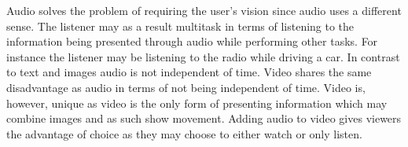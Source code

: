 Audio solves the problem of requiring the user's vision since audio uses a different sense. The listener may as a result multitask in terms of listening to the information being presented through audio while performing other tasks. For instance the listener may be listening to the radio while driving a car. In contrast to text and images audio is not independent of time. Video shares the same disadvantage as audio in terms of not being independent of time. Video is, however, unique as video is the only form of presenting information which may combine images and as such show movement. Adding audio to video gives viewers the advantage of choice as they may choose to either watch or only listen.